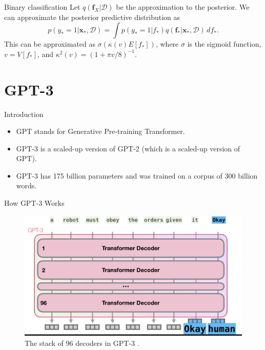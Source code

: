 \documentclass{beamer}
\begin{document}
\begin{frame}{Binary classification}
    Let $q(\boldsymbol{f}_X | \mathcal{D})$ be the approximation to the posterior. We can approximate the posterior predictive distribution as
    \[
    p(y_* = 1 | \boldsymbol{x}_*, \mathcal{D}) = \int p(y_* = 1 | f_*)q(\boldsymbol{f}_* | \boldsymbol{x}_*, \mathcal{D})\,df_*.
    \]
    This can be approximated as $\sigma(\kappa(v)E[f_*])$, where $\sigma$ is the sigmoid function, $v = V[f_*]$, and $\kappa^2(v) = (1 + \pi v / 8)^{-1}$.
\end{frame}

\section{GPT-3}

\begin{frame}{Introduction}
    \begin{itemize}
        \item GPT stands for Generative Pre-training Transformer.
        \item GPT-3 is a scaled-up version of GPT-2 (which is a scaled-up version of GPT).
        \item GPT-3 has 175 billion parameters and was trained on a corpus of 300 billion words.
    \end{itemize}
\end{frame}

\begin{frame}{How GPT-3 Works}
    \begin{figure}
        \centering
        \includegraphics[scale=0.35]{gpt3_decoders}
        \caption{The stack of 96 decoders in GPT-3 \cite{alammar2020}.}
        \label{fig:gpt3_decoders}
    \end{figure}
\end{frame}
\end{document}
